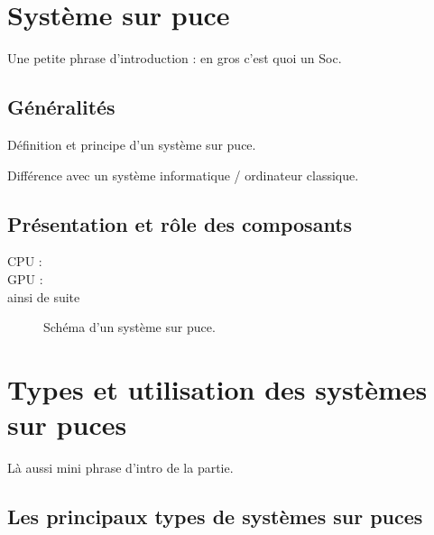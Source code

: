 \documentclass[a4paper,11pt]{article}
\begin{document}
\section{Système sur puce}

Une petite phrase d'introduction : en gros c'est quoi un Soc.

\subsection{Généralités}

Définition et principe d'un système sur puce.

Différence avec un système informatique / ordinateur classique.

\subsection{Présentation et rôle des composants}

\begin{description}
\item [CPU :]

\item [GPU : ]

\item [ainsi de suite]

\end{description}


\begin{figure}[!h]
\begin{center}
  \caption{Schéma d'un système sur puce.}
  \label{etiquette_de_la_figure_pour_y_faire_reference_plus_tard}
\end{center}
\end{figure}

\section{Types et utilisation des systèmes sur puces}

Là aussi mini phrase d'intro de la partie.

\subsection{Les principaux types de systèmes sur puces}
\end{document}
